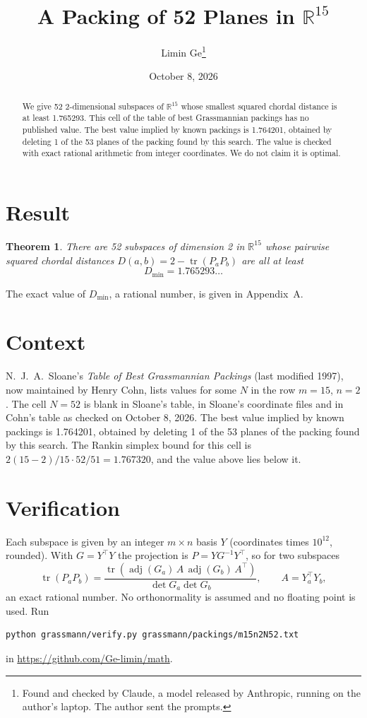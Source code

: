 \documentclass[11pt,a4paper]{article}
\title{A Packing of 52 Planes in $\mathbb{R}^{15}$}
\author{Limin Ge\thanks{Found and checked by Claude, a model released by Anthropic, running on the author's laptop. The author sent the prompts.}}
\date{October 8, 2026}
\newtheorem*{theorem}{Theorem}
\begin{document}
\maketitle
\begin{abstract}
We give 52 2-dimensional subspaces of $\mathbb{R}^{15}$ whose smallest squared chordal distance is at least 1.765293. This cell of the table of best Grassmannian packings has no published value. The best value implied by known packings is 1.764201, obtained by deleting 1 of the 53 planes of the packing found by this search. The value is checked with exact rational arithmetic from integer coordinates. We do not claim it is optimal.
\end{abstract}

\section{Result}
\begin{theorem}
There are 52 subspaces of dimension 2 in $\mathbb{R}^{15}$ whose pairwise squared chordal distances $D(a,b) = 2 - \operatorname{tr}(P_aP_b)$ are all at least
\[ D_{\min} = 1.765293\ldots \]
\end{theorem}
The exact value of $D_{\min}$, a rational number, is given in Appendix~A.


\section{Context}
N.~J.~A.~Sloane's \emph{Table of Best Grassmannian Packings} (last modified 1997), now maintained by Henry Cohn, lists values for some $N$ in the row $m=15$, $n=2$. The cell $N=52$ is blank in Sloane's table, in Sloane's coordinate files and in Cohn's table as checked on October 8, 2026. The best value implied by known packings is 1.764201, obtained by deleting 1 of the 53 planes of the packing found by this search. The Rankin simplex bound for this cell is $2(15-2)/15\cdot 52/51 = 1.767320$, and the value above lies below it.


\section{Verification}
Each subspace is given by an integer $m\times n$ basis $Y$ (coordinates times $10^{12}$, rounded). With $G=Y^\top Y$ the projection is $P=YG^{-1}Y^\top$, so for two subspaces
\[ \operatorname{tr}(P_aP_b)=\frac{\operatorname{tr}(\operatorname{adj}(G_a)\,A\,\operatorname{adj}(G_b)\,A^\top)}{\det G_a\det G_b},\qquad A=Y_a^\top Y_b, \]
an exact rational number. No orthonormality is assumed and no floating point is used. Run
\begin{verbatim}
python grassmann/verify.py grassmann/packings/m15n2N52.txt
\end{verbatim}
in \url{https://github.com/Ge-limin/math}.
\end{document}
